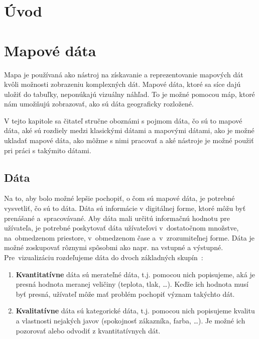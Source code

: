 

\chapter{Úvod}



\chapter{Mapové dáta}
\label{map-data}
Mapa je používaná ako nástroj na získavanie a reprezentovanie mapových dát kvôli možnosti zobrazeniu komplexných dát. Mapové dáta, ktoré sa síce dajú uložiť do tabuľky, neponúkajú vizuálny náhľad. To je možné pomocou máp, ktoré nám umožňujú zobrazovať, ako sú dáta geograficky rozložené.

V tejto kapitole sa čitateľ stručne oboznámi s pojmom dáta, čo sú to mapové dáta, aké sú rozdiely medzi klasickými dátami a mapovými dátami, ako je možné ukladať mapové dáta, ako môžme s nimi pracovať a aké nástroje je možné použiť pri práci s takýmito dátami.
 

\section{Dáta}
Na to, aby bolo možné lepšie pochopiť, o čom sú mapové dáta, je potrebné vysvetliť, čo sú to dáta. Dáta sú informácie v digitálnej forme, ktoré môžu byť prenášané a~spracovávané. Aby dáta mali určitú informačnú hodnotu pre užívateľa, je potrebné poskytovať dáta užívateľovi v~dostatočnom množstve, na~obmedzenom priestore, v~obmedzenom čase a~v~zrozumiteľnej forme. Dáta je možné zoskupovať rôznymi spôsobmi ako napr. na vstupné a výstupné. Pre~vizualizáciu rozdeľujeme dáta do dvoch základných skupín~\cite{hynek2021webvisual}:
\begin{enumerate}
    \item \textbf{Kvantitatívne} dáta sú merateľné dáta, t.j. pomocou nich popisujeme, aká je presná hodnota meranej veličiny (teplota, tlak, \ldots). Keďže ich hodnota musí byť presná, užívateľ môže mať problém pochopiť význam takýchto dát.
    \item \textbf{Kvalitatívne} dáta sú kategorické dáta, t.j. pomocou nich popisujeme kvalitu a vlastnosti nejakých javov (spokojnosť zákazníka, farba, \ldots). Je možné ich pozorovať alebo odvodiť z kvantitatívnych dát.
\end{enumerate}

